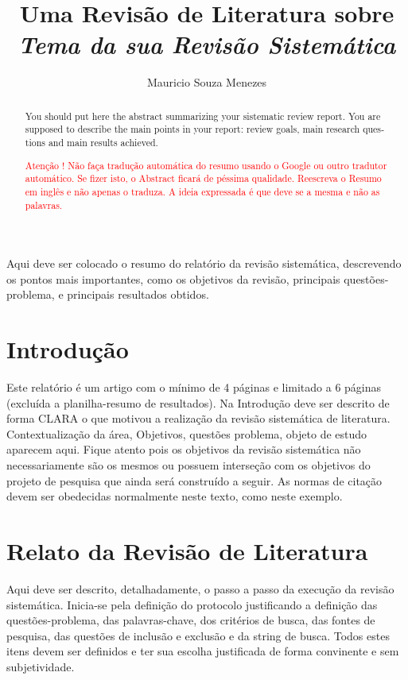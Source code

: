 \documentclass[12pt]{article}
\title{Uma Revisão de Literatura sobre \textit{Tema da sua Revisão Sistemática}}
\author{Mauricio Souza Menezes\\}
\begin{document}
 

\maketitle

\begin{resumo}
    Aqui deve ser colocado o resumo do relatório da revisão sistemática, descrevendo os pontos mais importantes, como os objetivos da revisão, principais questões-problema, e principais resultados obtidos.
\end{resumo}


\begin{abstract}
\begin{otherlanguage}{english}
    You should put here the abstract summarizing your sistematic review report. You are supposed to describe the main points in your report: review goals, main research questions and main results achieved. 
\end{otherlanguage} \textcolor{red}{Atenção ! Não faça tradução automática do resumo usando o Google ou outro tradutor automático. Se fizer isto, o Abstract ficará de péssima qualidade. Reescreva o Resumo em inglês e não apenas o traduza. A ideia expressada é que deve se a mesma e não as palavras.}
\end{abstract}


\section{Introdução}

Este relatório é um artigo com o mínimo de 4 páginas e limitado a 6 páginas (excluída a planilha-resumo de resultados). Na Introdução deve ser descrito de forma CLARA o que motivou a realização da revisão sistemática de literatura. Contextualização da área, Objetivos, questões problema, objeto de estudo aparecem aqui. Fique atento pois os objetivos da revisão sistemática não necessariamente são os mesmos ou possuem interseção com os objetivos do projeto de pesquisa que ainda será construído a seguir. As normas de citação devem ser obedecidas normalmente neste texto, como neste exemplo\cite{Laranjeira2015}.

\section{Relato da Revisão de Literatura}

Aqui deve ser descrito, detalhadamente, o passo a passo da execução da revisão sistemática. Inicia-se pela definição do protocolo justificando a definição das questões-problema, das palavras-chave, dos critérios de busca, das fontes de pesquisa, das questões de inclusão e exclusão e da string de busca. Todos estes itens devem ser definidos e ter sua escolha justificada de forma convinente e sem subjetividade.
\end{document}
